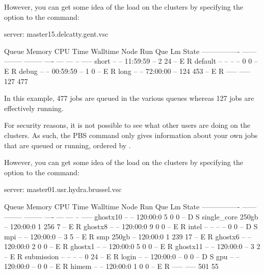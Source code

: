   However, you can get some idea of the load on the clusters by specifying
  the  option to the  command:

\begin{prompt}
server: master15.delcatty.gent.vsc

Queue            Memory CPU Time Walltime Node  Run Que Lm  State
---------------- ------ -------- -------- ----  --- --- --  -----
short              --      --    11:59:59   --    2  24 --   E R
default            --      --       --      --    0   0 --   E R
debug              --      --    00:59:59   --    1   0 --   E R
long               --      --    72:00:00   --  124 453 --   E R
                                               ----- -----
                                                 127   477
\end{prompt}

  In this example, 477 jobs are queued in the various queues whereas 127 jobs
  are effectively running.

\else
\ifbrussel
  For security reasons, it is not possible to see what other users are doing on
  the clusters. As such, the PBS  command only gives information
  about your own jobs that are queued or running, ordered by .

  However, you can get some idea of the load on the clusters by specifying
  the  option to the  command:

\begin{prompt}
server: master01.usr.hydra.brussel.vsc

Queue            Memory CPU Time Walltime Node  Run Que Lm  State
---------------- ------ -------- -------- ----  --- --- --  -----
ghostx10           --      --    120:00:0     5   0   0 --   D S
single_core       250gb    --    120:00:0     1 256   7 --   E R
ghostx8            --      --    120:00:0     9   0   0 --   E R
intel              --      --       --      --    0   0 --   D S
mpi                --      --    120:00:0   --    3   5 --   E R
smp               250gb    --    120:00:0     1 239  17 --   E R
ghostx6            --      --    120:00:0     2   0   0 --   E R
ghostx1            --      --    120:00:0     5   0   0 --   E R
ghostx11           --      --    120:00:0   --    3   2 --   E R
submission         --      --       --      --    0  24 --   E R
login              --      --    120:00:0   --    0   0 --   D S
gpu                --      --    120:00:0   --    0   0 --   E R
himem              --      --    120:00:0     1   0   0 --   E R
                                               ----- -----
                                                 501    55
\end{prompt}

